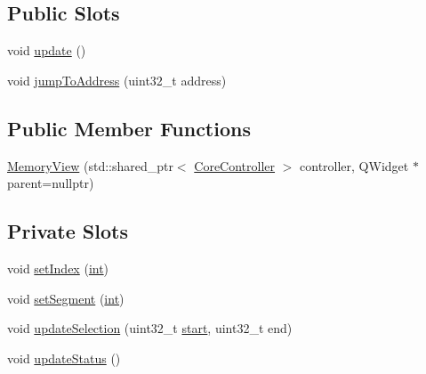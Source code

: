 \subsection*{Public Slots}
\begin{DoxyCompactItemize}
\item 
void \mbox{\hyperlink{class_q_g_b_a_1_1_memory_view_a7f782144cc93b71df28e9806c0c91ee8}{update}} ()
\item 
void \mbox{\hyperlink{class_q_g_b_a_1_1_memory_view_aa3cdb87abcb60323bbf4a3dfe01d63e9}{jump\+To\+Address}} (uint32\+\_\+t address)
\end{DoxyCompactItemize}
\subsection*{Public Member Functions}
\begin{DoxyCompactItemize}
\item 
\mbox{\hyperlink{class_q_g_b_a_1_1_memory_view_a62ee466e88e04e0e714975227560070a}{Memory\+View}} (std\+::shared\+\_\+ptr$<$ \mbox{\hyperlink{class_q_g_b_a_1_1_core_controller}{Core\+Controller}} $>$ controller, Q\+Widget $\ast$parent=nullptr)
\end{DoxyCompactItemize}
\subsection*{Private Slots}
\begin{DoxyCompactItemize}
\item 
void \mbox{\hyperlink{class_q_g_b_a_1_1_memory_view_a1006e186a3bd5335c02a59795713b2df}{set\+Index}} (\mbox{\hyperlink{ioapi_8h_a787fa3cf048117ba7123753c1e74fcd6}{int}})
\item 
void \mbox{\hyperlink{class_q_g_b_a_1_1_memory_view_a0f43bc37a3fcabae7882b24dd5a7023e}{set\+Segment}} (\mbox{\hyperlink{ioapi_8h_a787fa3cf048117ba7123753c1e74fcd6}{int}})
\item 
void \mbox{\hyperlink{class_q_g_b_a_1_1_memory_view_a03e597889e524eda48b0b3c89a23737c}{update\+Selection}} (uint32\+\_\+t \mbox{\hyperlink{tarith_8c_a7b8af9b9d992acd1d81caf9bb377f6c2a0e97c69c73117f6c0109b2d7d1d9cedc}{start}}, uint32\+\_\+t end)
\item 
void \mbox{\hyperlink{class_q_g_b_a_1_1_memory_view_a3a0e363a2005a30876b2a9f0967a0f67}{update\+Status}} ()
\end{DoxyCompactItemize}
